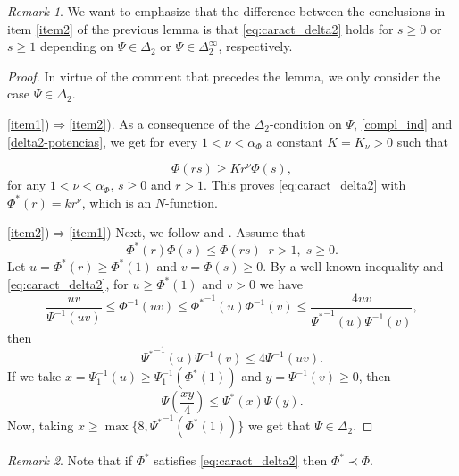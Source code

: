 \documentclass[twoside]{elsarticle}
\theoremstyle{remark}
\newtheorem{comentario}{Remark}
\renewcommand{\leq}{\leqslant}
\renewcommand{\geq}{\geqslant}
\begin{document}
\begin{comentario} We want to emphasize that the difference between the conclusions in item \ref{item2} of the previous lemma
is  that \eqref{eq:caract_delta2} holds for $s\geq 0$ or $s\geq 1$ depending on 
$\Psi\in\Delta_2$ or $\Psi\in\Delta_2^{\infty}$,  respectively.

\end{comentario}


\begin{proof}
 In virtue of the comment that precedes the lemma, we only consider the case   $\Psi \in \Delta_2$.

\ref{item1})$\Rightarrow$\ref{item2}).
As a consequence of the $\Delta_2$-condition on $\Psi$, \eqref{compl_ind} and \eqref{delta2-potencias}, 
we get for every $1<\nu<\alpha_{\Phi}$ a constant $K=K_{\nu}>0$  such that

\begin{equation}\label{delta2-consecuencia}
\Phi(r s)\geq Kr^{\nu}\Phi(s),
\end{equation}
for any $1<\nu<\alpha_{\Phi}$,  $s\geq 0$ and $r>1$. This proves  \eqref{eq:caract_delta2} with $\Phi^*(r)=kr^\nu$, which is an $N$-function.

\ref{item2})$\Rightarrow$\ref{item1})
Next, we follow  \cite[p. 32, Prop. 13]{rao1991theory} and \cite[p. 29, Prop. 9]{rao1991theory}.
Assume that 
\[
\Phi^*(r)\Phi(s)\leq \Phi(rs)\;\;r>1,\;s\geq 0.
\]
Let $u=\Phi^*(r)\geq \Phi^*(1)$ and $v=\Phi(s)\geq 0$. By a well known inequality \cite[p. 13, Prop. 1]{rao1991theory} and \eqref{eq:caract_delta2},   for $u\geq \Phi^*(1)$ and $v> 0$ we have 
\[
\frac{uv}{\Psi^{-1}(uv)}\leq \Phi^{-1}(uv)\leq{\Phi^*}^{-1}(u)\Phi^{-1}(v)\leq
\frac{4uv}{{\Psi^*}^{-1}(u)\Psi^{-1}(v)},
\]
then 
\[
{\Psi^*}^{-1}(u)\Psi^{-1}(v)\leq 4 \Psi^{-1}(uv).
\]
If we take $x=\Psi^{-1}_1(u)\geq \Psi^{-1}_1(\Phi^*(1))$ and $y=\Psi^{-1}(v)\geq 0$, then 
\[
\Psi\left(\frac{xy}{4}\right)\leq \Psi^*(x)\Psi(y).
\]
Now, taking  $x\geq \max\{8,{\Psi^*}^{-1}(\Phi^*(1))\}$ we get that $\Psi \in \Delta_2$.
\end{proof}

\begin{comentario} Note that if $\Phi^*$ satisfies \eqref{eq:caract_delta2} then $\Phi^*\prec \Phi$.
 \end{comentario}
\end{document}

